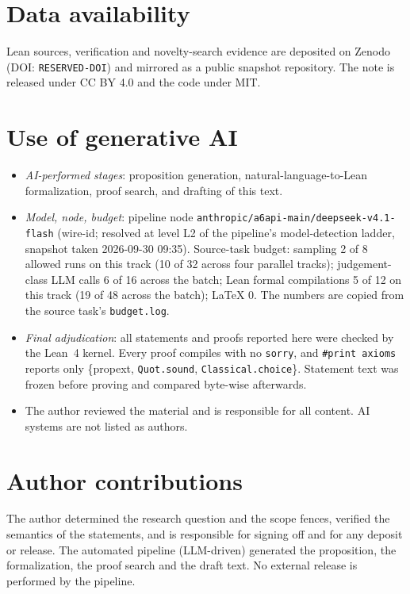 \documentclass[11pt]{article}
\begin{document}
\section*{Data availability}
Lean sources, verification and novelty-search evidence are deposited on Zenodo
(DOI: \texttt{RESERVED-DOI}) and mirrored as a public snapshot repository. The note is
released under CC BY 4.0 and the code under MIT.

\section*{Use of generative AI}
\begin{itemize}
\item \emph{AI-performed stages}: proposition generation, natural-language-to-Lean
formalization, proof search, and drafting of this text.
\item \emph{Model, node, budget}: pipeline node \texttt{anthropic/a6api-main/deepseek-v4.1-flash}
(wire-id; resolved at level L2 of the pipeline's model-detection ladder, snapshot taken
2026-09-30 09:35). Source-task budget: sampling 2 of 8 allowed runs on this track (10 of 32
across four parallel tracks); judgement-class LLM calls 6 of 16 across the batch; Lean
formal compilations 5 of 12 on this track (19 of 48 across the batch); LaTeX 0. The numbers are
copied from the source task's \texttt{budget.log}.
\item \emph{Final adjudication}: all statements and proofs reported here were checked by the
Lean~4 kernel. Every proof compiles with no \texttt{sorry}, and \texttt{\#print axioms}
reports only \{propext, \texttt{Quot.sound}, \texttt{Classical.choice}\}. Statement text was
frozen before proving and compared byte-wise afterwards.
\item The author reviewed the material and is responsible for all content. AI systems are
not listed as authors.
\end{itemize}

\section*{Author contributions}
The author determined the research question and the scope fences, verified the semantics of
the statements, and is responsible for signing off and for any deposit or release. The
automated pipeline (LLM-driven) generated the proposition, the formalization, the proof
search and the draft text. No external release is performed by the pipeline.
\end{document}
